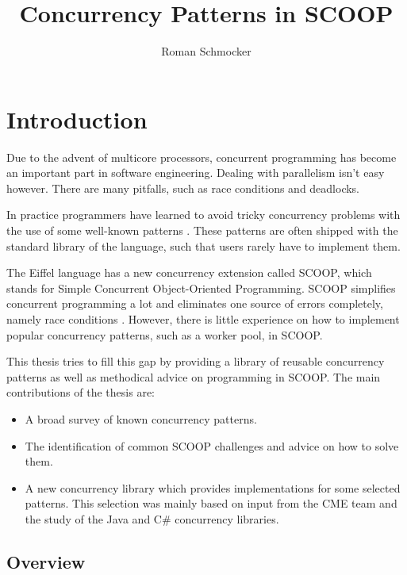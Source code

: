 \documentclass[a4paper,10pt]{article}
\title{Concurrency Patterns in SCOOP}
\author{Roman Schmocker}
\newcommand{\todoref}{\todo{ref}}
\begin{document}
\maketitle

\begin{abstract}

\end{abstract}

\tableofcontents

\section{Introduction}
\label{sec:introduction}

Due to the advent of multicore processors, concurrent programming has become an important part in software engineering.
Dealing with parallelism isn't easy however.
There are many pitfalls, such as race conditions and deadlocks.

In practice programmers have learned to avoid tricky concurrency problems with the use of some well-known patterns .
These patterns are often shipped with the standard library of the language, such that users rarely have to implement them.

The Eiffel language \todoref has a new concurrency extension called SCOOP, which stands for Simple Concurrent Object-Oriented Programming.
SCOOP simplifies concurrent programming a lot and eliminates one source of errors completely, namely race conditions \todoref.
However, there is little experience on how to implement popular concurrency patterns, such as a worker pool, in SCOOP.

This thesis tries to fill this gap by providing a library of reusable concurrency patterns as well as methodical advice on programming in SCOOP.
The main contributions of the thesis are:
\begin{itemize}
 \item A broad survey of known concurrency patterns.
 \item The identification of common SCOOP challenges and advice on how to solve them.
 \item A new concurrency library which provides implementations for some selected patterns.
 This selection was mainly based on input from the CME team \todoref and the study of the Java \todoref and C\# \todoref concurrency libraries.
\end{itemize}

\subsection{Overview}
\end{document}
